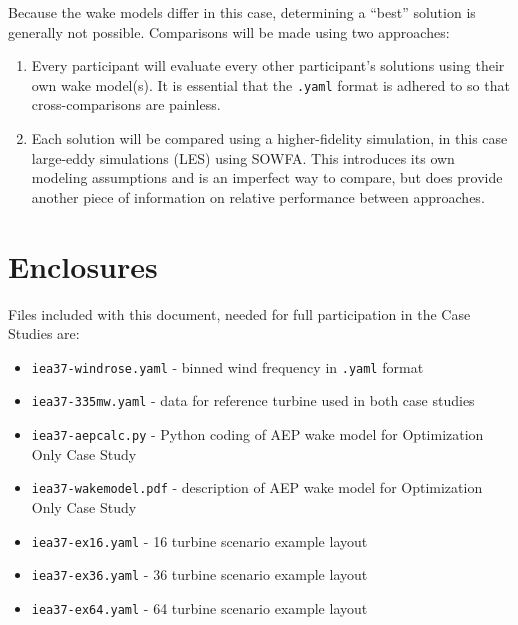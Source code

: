 \documentclass{article}
\begin{document}
        Because the wake models differ in this case, determining a ``best'' solution is generally not possible.  Comparisons will be made using two approaches:
        \begin{enumerate}
            \item Every participant will evaluate every other participant's solutions using their own wake model(s).  It is essential that the \texttt{.yaml} format is adhered to so that cross-comparisons are painless. %
            \item Each solution will be compared using a higher-fidelity simulation, in this case large-eddy simulations (LES) using SOWFA.  This introduces its own modeling assumptions and is an imperfect way to compare, but does provide another piece of information on relative performance between approaches. %
        \end{enumerate}

\section{Enclosures}
    Files included with this document, needed for full participation in the Case Studies are:

    \begin{itemize}[noitemsep,topsep=0pt,parsep=0pt,partopsep=0pt]
        \item \texttt{iea37-windrose.yaml} - binned wind frequency in \texttt{.yaml} format
        \item \texttt{iea37-335mw.yaml} - data for reference turbine used in both case studies
        \item \texttt{iea37-aepcalc.py} - Python coding of AEP wake model for Optimization Only Case Study
        \item \texttt{iea37-wakemodel.pdf} - description of AEP wake model for Optimization Only Case Study
        \item \texttt{iea37-ex16.yaml} - 16 turbine scenario example layout
        \item \texttt{iea37-ex36.yaml} - 36 turbine scenario example layout
        \item \texttt{iea37-ex64.yaml} - 64 turbine scenario example layout
    \end{itemize}
\newpage


\end{document}
